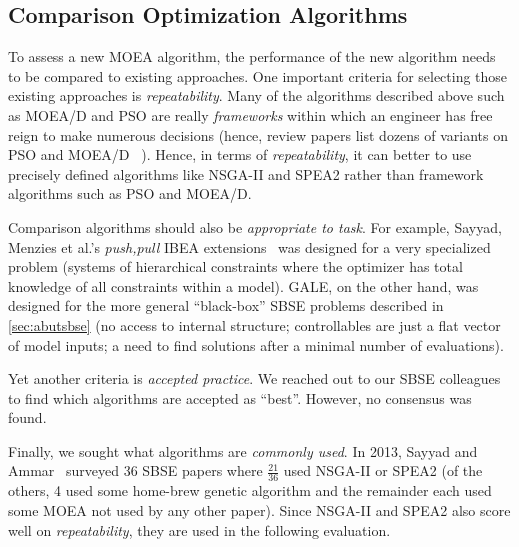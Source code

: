 \documentclass[10pt,journal,compsoc]{IEEEtran}
\newcommand{\tion}[1]{\textsection\ref{sec:#1}}
\newenvironment{changed}{\par}{\par}
\begin{document}
\subsection{Comparison Optimization Algorithms}\label{sec:compares}
\begin{changed}
To  assess a new MOEA algorithm, the performance of the new algorithm needs
to be compared to existing approaches.
One important criteria for selecting those existing approaches is
 {\em repeatability}. 
Many of the algorithms described above such as MOEA/D and PSO
are really {\em frameworks} within which an engineer has free reign to make numerous decisions
(hence, 
review papers list dozens of variants on  PSO and MOEA/D ~\cite{V.Sedenka2010,5601760}).
Hence, in terms of {\em repeatability}, it can better to use precisely defined algorithms like NSGA-II and SPEA2 rather than framework algorithms such as PSO and MOEA/D.

Comparison algorithms should also be {\em appropriate to task}.  
For example, Sayyad, Menzies et al.'s {\em push,pull} IBEA
extensions~\cite{sayyad13a,sayyad13b} was designed
for a very specialized problem (systems of
hierarchical constraints where the optimizer has
total knowledge of all constraints within a model).
GALE, on the other hand, was designed for the more
general ``black-box'' SBSE problems described in
\tion{abutsbse} (no access to internal structure;
controllables are just a flat vector of model
inputs; a need to find solutions after a minimal
number of evaluations).

Yet another criteria is {\em accepted practice}. We reached out to our SBSE colleagues to
 find
which algorithms are accepted as ``best''.  However, no consensus was found.

Finally, we sought  what algorithms are {\em commonly used}.
In 2013, Sayyad and Ammar~\cite{sayyad13c} surveyed 36 SBSE papers where $\frac{21}{36}$
used NSGA-II or SPEA2 (of the others, 4 used some home-brew genetic algorithm and the remainder
each used some MOEA not used by any other paper). Since NSGA-II and SPEA2 
also score well on {\em repeatability},
they are used in the following evaluation.
\end{changed}
\end{document}
